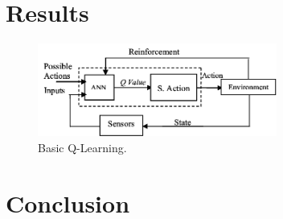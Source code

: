 \documentclass[a4paper]{article}
\begin{document}
	
	\section{Results}
	\label{sec:results}
	
	
	\begin{figure}[t]
		\centering
		\includegraphics[angle=0,width=0.7\textwidth]{./figs/RL_ANN.png}
		\caption{\label{fig:image}Basic Q-Learning.}
	\end{figure}
	
	
	
	\section{Conclusion}
	
	
	\footnotesize
	
	
	
\end{document}
